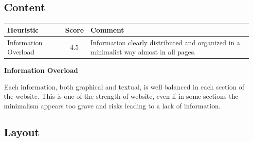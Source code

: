\subsection{Content}
\begin{table}[H]
  \begin{center}
    \label{tab:table1}
    \begin{tabular}{||l|c|p{8cm}||} %
      \textbf{Heuristic} & \textbf{Score} & \textbf{Comment}\\
      
      \hline
     Information Overload & 4.5 & Information clearly distributed and organized in a minimalist way almost in all pages.\\
     
    \end{tabular}
  \end{center}
\end{table}
\medskip
\textbf{Information Overload}\par
Each information, both graphical and textual, is well balanced in each section of the website. This is one of the strength of website, even if in some sections the minimalism appears too grave and risks leading to a lack of information.

\subsection{Layout}
\label{Layout}

